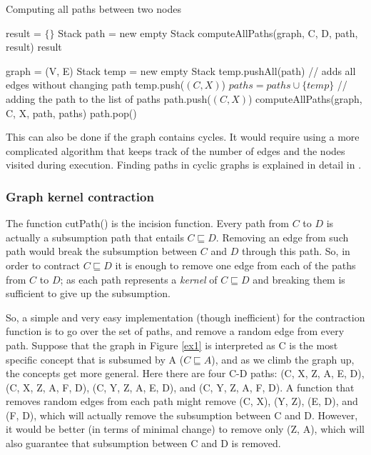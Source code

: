 \begin{algorithm}
\caption{Computing all paths between two nodes}
\label{GetPaths}
\begin{algorithmic}[1]
\State result = $\{\}$
\State Stack path = new empty Stack
\State computeAllPaths(graph, C, D, path, result)
\State \Return result
\EndFunction
\end{algorithmic}

\begin{algorithmic}[1]
\State graph = (V, E)
\State Stack temp = new empty Stack
\State temp.pushAll(path)  // adds all edges without changing path
\State temp.push($(C, X)$)
\State $paths = paths \cup \{temp\}$  // adding the path to the list of paths
\Else
\State path.push($(C, X)$)
\State computeAllPaths(graph, C, X, path, paths)
\State path.pop()
\EndIf
\EndFor
\EndFunction
\end{algorithmic}
\end{algorithm}

This can also be done if the graph contains cycles. It would require using a more complicated algorithm that keeps track of the number of edges and the nodes visited during execution. Finding paths in cyclic graphs is explained in detail in \cite{alg}.

\subsubsection{Graph kernel contraction}
The function cutPath() is the incision function. Every path from $C$ to $D$ is actually a subsumption path that entails $C \sqsubseteq D$. Removing an edge from such path would break the subsumption between $C$ and $D$ through this path. So, in order to contract $C \sqsubseteq D$ it is enough to remove one edge from each of the paths from $C$ to $D$; as each path represents a \textit{kernel} of $C \sqsubseteq D$ and breaking them is sufficient to give up the subsumption. 

So, a simple and very easy implementation (though inefficient) for the contraction function is to go over the set of paths, and remove a random edge from every path. Suppose that the graph in Figure \ref{ex1} is interpreted as C is the most specific concept that is subsumed by A ($C \sqsubseteq A$), and as we climb the graph up, the concepts get more general. Here there are four C-D paths: (C, X, Z, A, E, D), (C, X, Z, A, F, D), (C, Y, Z, A, E, D), and (C, Y, Z, A, F, D). A function that removes random edges from each path might remove (C, X), (Y, Z), (E, D), and (F, D), which will actually remove the subsumption between C and D. However, it would be better (in terms of minimal change) to remove only (Z, A), which will also guarantee that subsumption between C and D is removed.

